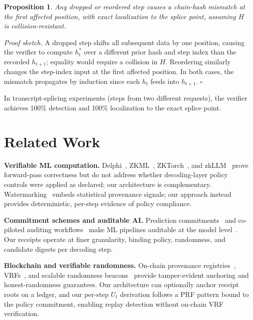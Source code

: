 \documentclass[conference]{IEEEtran}
\newtheorem{proposition}{Proposition}
\begin{document}
\begin{proposition}\label{prop:chain}
Any dropped or reordered step causes a chain-hash mismatch at the first affected position, with exact localization to the splice point, assuming $H$ is collision-resistant.
\end{proposition}

\textit{Proof sketch.}
A dropped step shifts all subsequent data by one position, causing the verifier to compute $h_t^*$ over a different prior hash and step index than the recorded $h_{t+1}$; equality would require a collision in $H$. Reordering similarly changes the step-index input at the first affected position. In both cases, the mismatch propagates by induction since each $h_t$ feeds into $h_{t+1}$.
\hfill$\square$

In transcript-splicing experiments (steps from two different requests), the verifier achieves 100\% detection and 100\% localization to the exact splice point.

\section{Related Work}

\textbf{Verifiable ML computation.}
Delphi~\cite{Delphi2020}, ZKML~\cite{ZKML2024}, ZKTorch~\cite{ZKTorch2025}, and zkLLM~\cite{zkLLM2024} prove forward-pass correctness but do not address whether decoding-layer policy controls were applied as declared; our architecture is complementary. Watermarking~\cite{Kirchenbauer2023Watermark} embeds statistical provenance signals; our approach instead provides deterministic, per-step evidence of policy compliance.

\textbf{Commitment schemes and auditable AI.}
Prediction commitments~\cite{Pinocchio2013} and co-piloted auditing workflows~\cite{Gu2024CoPilotedAuditing} make ML pipelines auditable at the model level~\cite{Kapoor2024OpenFMs}. Our receipts operate at finer granularity, binding policy, randomness, and candidate digests per decoding step.

\textbf{Blockchain and verifiable randomness.}
On-chain provenance registries~\cite{Akor2025ProvAuditChain}, VRFs~\cite{Micali1999VRF}, and scalable randomness beacons~\cite{Rondo2024} provide tamper-evident anchoring and honest-randomness guarantees. Our architecture can optionally anchor receipt roots on a ledger, and our per-step $U_t$ derivation follows a PRF pattern bound to the policy commitment, enabling replay detection without on-chain VRF verification.
\end{document}
